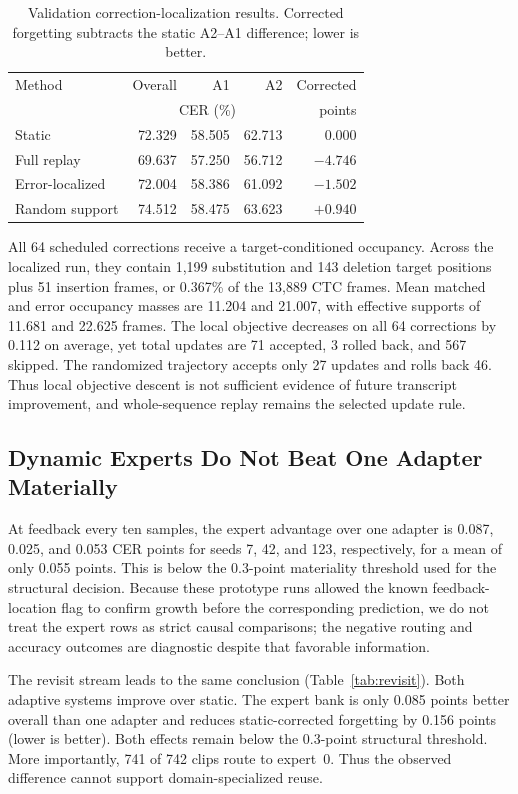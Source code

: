\begin{table}[t]
\centering
\caption{Validation correction-localization results. Corrected forgetting subtracts the static A2--A1 difference; lower is better.}
\label{tab:validation_local}
\begin{tabular}{lrrrr}
\toprule
Method & Overall & A1 & A2 & Corrected \\
 & \multicolumn{3}{c}{CER (\%)} & points \\
\midrule
Static & 72.329 & 58.505 & 62.713 & 0.000 \\
Full replay & 69.637 & 57.250 & 56.712 & $-4.746$ \\
Error-localized & 72.004 & 58.386 & 61.092 & $-1.502$ \\
Random support & 74.512 & 58.475 & 63.623 & $+0.940$ \\
\bottomrule
\end{tabular}
\end{table}

All 64 scheduled corrections receive a target-conditioned occupancy. Across the localized run, they contain 1,199 substitution and 143 deletion target positions plus 51 insertion frames, or 0.367\% of the 13,889 CTC frames. Mean matched and error occupancy masses are 11.204 and 21.007, with effective supports of 11.681 and 22.625 frames. The local objective decreases on all 64 corrections by 0.112 on average, yet total updates are 71 accepted, 3 rolled back, and 567 skipped. The randomized trajectory accepts only 27 updates and rolls back 46. Thus local objective descent is not sufficient evidence of future transcript improvement, and whole-sequence replay remains the selected update rule.

\subsection{Dynamic Experts Do Not Beat One Adapter Materially}

At feedback every ten samples, the expert advantage over one adapter is 0.087, 0.025, and 0.053 CER points for seeds 7, 42, and 123, respectively, for a mean of only 0.055 points. This is below the 0.3-point materiality threshold used for the structural decision. Because these prototype runs allowed the known feedback-location flag to confirm growth before the corresponding prediction, we do not treat the expert rows as strict causal comparisons; the negative routing and accuracy outcomes are diagnostic despite that favorable information.

The revisit stream leads to the same conclusion (Table~\ref{tab:revisit}). Both adaptive systems improve over static. The expert bank is only 0.085 points better overall than one adapter and reduces static-corrected forgetting by 0.156 points (lower is better). Both effects remain below the 0.3-point structural threshold. More importantly, 741 of 742 clips route to expert~0. Thus the observed difference cannot support domain-specialized reuse.


